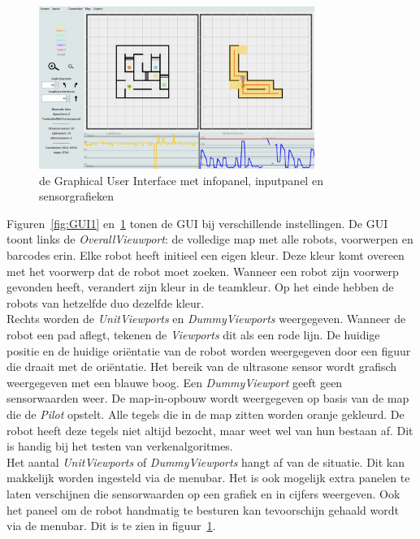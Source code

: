 \documentclass[tt3]{penoverslag}
\begin{document}
\begin{figure}[h]
\centering
	\includegraphics[width=0.8\textwidth]{GUI2}
\caption{de Graphical User Interface met infopanel, inputpanel en sensorgrafieken}
\label{fig:GUI2}
\end{figure}

Figuren~\ref{fig:GUI1} en~\ref{fig:GUI2} tonen de GUI bij verschillende instellingen. De GUI toont links de \textit{OverallVieuwport}: de volledige map met alle robots, voorwerpen en barcodes erin. Elke robot heeft initieel een eigen kleur. Deze kleur komt overeen met het voorwerp dat de robot moet zoeken. Wanneer een robot zijn voorwerp gevonden heeft, verandert zijn kleur in de teamkleur. Op het einde hebben de robots van hetzelfde duo dezelfde kleur.\\

Rechts worden de \textit{UnitViewports} en \textit{DummyViewports} weergegeven. Wanneer de robot een pad aflegt, tekenen de \textit{Viewports} dit als een rode lijn. De huidige positie en de huidige ori\"entatie van de robot worden weergegeven door een figuur die draait met de ori\"entatie. Het bereik van de ultrasone sensor wordt grafisch weergegeven met een blauwe boog. Een \textit{DummyViewport} geeft geen sensorwaarden weer. De map-in-opbouw wordt weergegeven op basis van de map die de \textit{Pilot} opstelt. Alle tegels die in de map zitten worden oranje gekleurd. De robot heeft deze tegels niet altijd bezocht, maar weet wel van hun bestaan af. Dit is handig bij het testen van verkenalgoritmes.\\

Het aantal \textit{UnitViewports} of \textit{DummyViewports} hangt af van de situatie. Dit kan makkelijk worden ingesteld via de menubar. Het is ook mogelijk extra panelen te laten verschijnen die sensorwaarden op een grafiek en in cijfers weergeven. Ook het paneel om de robot handmatig te besturen kan tevoorschijn gehaald wordt via de menubar. Dit is te zien in figuur~\ref{fig:GUI2}.
\end{document}
